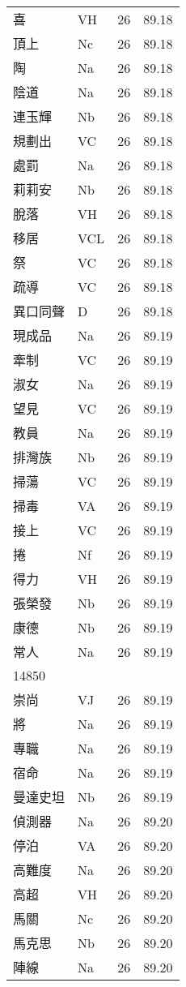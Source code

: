 \documentclass[twocolumn]{book}
\begin{document}
\begin{supertabular}{llrr}
喜 & VH & 26 &  89.18\\
頂上 & Nc & 26 &  89.18\\
陶 & Na & 26 &  89.18\\
陰道 & Na & 26 &  89.18\\
連玉輝 & Nb & 26 &  89.18\\
規劃出 & VC & 26 &  89.18\\
處罰 & Na & 26 &  89.18\\
莉莉安 & Nb & 26 &  89.18\\
脫落 & VH & 26 &  89.18\\
移居 & VCL & 26 &  89.18\\
祭 & VC & 26 &  89.18\\
疏導 & VC & 26 &  89.18\\
異口同聲 & D & 26 &  89.18\\
現成品 & Na & 26 &  89.19\\
牽制 & VC & 26 &  89.19\\
淑女 & Na & 26 &  89.19\\
望見 & VC & 26 &  89.19\\
教員 & Na & 26 &  89.19\\
排灣族 & Nb & 26 &  89.19\\
掃蕩 & VC & 26 &  89.19\\
掃毒 & VA & 26 &  89.19\\
接上 & VC & 26 &  89.19\\
捲 & Nf & 26 &  89.19\\
得力 & VH & 26 &  89.19\\
張榮發 & Nb & 26 &  89.19\\
康德 & Nb & 26 &  89.19\\
常人 & Na & 26 &  89.19\\
14850\\
崇尚 & VJ & 26 &  89.19\\
將 & Na & 26 &  89.19\\
專職 & Na & 26 &  89.19\\
宿命 & Na & 26 &  89.19\\
曼達史坦 & Nb & 26 &  89.19\\
偵測器 & Na & 26 &  89.20\\
停泊 & VA & 26 &  89.20\\
高難度 & Na & 26 &  89.20\\
高超 & VH & 26 &  89.20\\
馬關 & Nc & 26 &  89.20\\
馬克思 & Nb & 26 &  89.20\\
陣線 & Na & 26 &  89.20\\

\end{supertabular}
\end{document}
